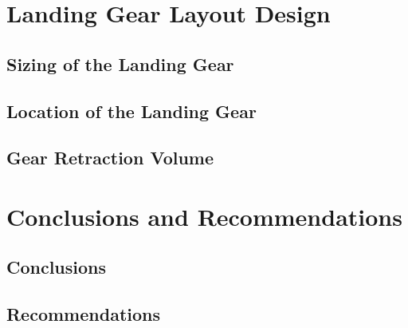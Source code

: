\documentclass[conf]{new-aiaa}
\begin{document}
\section{Landing Gear Layout Design}
\subsection{Sizing of the Landing Gear}
\subsection{Location of the Landing Gear}


\subsection{Gear Retraction Volume}

\section{Conclusions and Recommendations}
\subsection{Conclusions}

\subsection{Recommendations}
\end{document}
